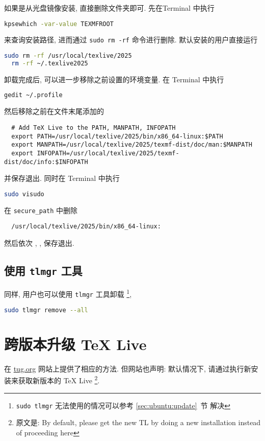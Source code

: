 如果是从光盘镜像安装,
直接删除文件夹即可.
先在\textsf{Terminal} 中执行
\begin{lstlisting}[language = bash]
  kpsewhich -var-value TEXMFROOT
\end{lstlisting}
来查询安装路径,
进而通过 \texttt{sudo rm -rf} 命令进行删除.
默认安装的用户直接运行
\begin{lstlisting}[language = bash]
  sudo rm -rf /usr/local/texlive/2025
  rm -rf ~/.texlive2025
\end{lstlisting}
卸载完成后, 可以进一步移除之前设置的环境变量.
在 \textsf{Terminal} 中执行
\begin{lstlisting}[language = bash]
  gedit ~/.profile
\end{lstlisting}
然后移除之前在文件末尾添加的
\begin{lstlisting}
  # Add TeX Live to the PATH, MANPATH, INFOPATH
  export PATH=/usr/local/texlive/2025/bin/x86_64-linux:$PATH
  export MANPATH=/usr/local/texlive/2025/texmf-dist/doc/man:$MANPATH
  export INFOPATH=/usr/local/texlive/2025/texmf-dist/doc/info:$INFOPATH
\end{lstlisting}
并保存退出.
同时在 \textsf{Terminal} 中执行
\begin{lstlisting}[language = bash]
  sudo visudo
\end{lstlisting}
在 \texttt{secure\_path} 中删除
\begin{lstlisting}
  /usr/local/texlive/2025/bin/x86_64-linux:
\end{lstlisting}
然后依次 , , \keys{\enter} 保存退出.

\subsection{使用 \texttt{tlmgr} 工具}

同样,
用户也可以使用 \texttt{tlmgr} 工具卸载%
\footnote{\texttt{sudo tlmgr} 无法使用的情况可以参考 \ref{sec:ubuntu:update}~节 解决},
\begin{lstlisting}[language=bash]
  sudo tlmgr remove --all
\end{lstlisting}

\section{跨版本升级 \TeX{} Live}\label{sec:ubuntu:version}

在 \href{https://www.tug.org/texlive/upgrade.html}{tug.org}
网站上提供了相应的方法.
但网站也声明:
默认情况下,
请通过执行新安装来获取新版本的 \TeX{} Live%
\footnote{原文是: By default,
  please get the new TL by doing a new installation instead of proceeding here}.